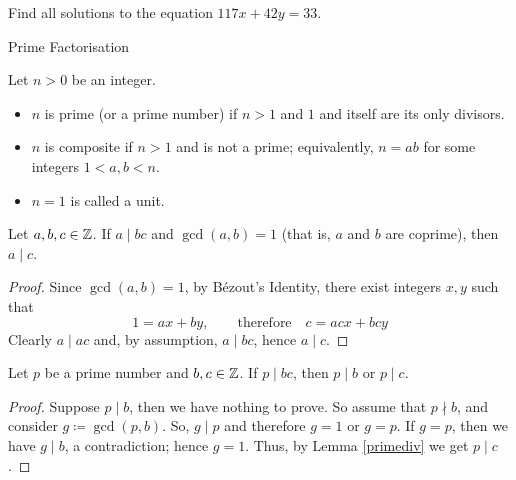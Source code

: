 \newpage

\begin{example}[in-class]
Find all solutions to the equation $117x + 42y = 33$.
\end{example}

\vspace*{2em}

\begin{center}
{\Large Prime Factorisation}
\end{center}

\begin{definition}
Let $n > 0$ be an integer.
\begin{itemize}
\item $n$ is prime (or a prime number) if $n> 1$ and $1$ and itself are its only divisors.
\item $n$ is composite if $n>1$ and is not a prime; equivalently, $n = ab$ for some integers $1<a,b<n$.
\item $n = 1$ is called a unit.
\end{itemize}
\end{definition}

\vspace*{1em}

\begin{lemma}\label{primediv}
Let $a,b,c \in \mathbb Z$. If $a\mid bc$ and $\gcd(a,b) = 1$ (that is, $a$ and $b$ are coprime), then $a\mid c$. 
\end{lemma}
\begin{proof}
Since $\gcd(a,b) = 1$, by B\'ezout's Identity, there exist integers $x,y$ such that 
\[1 = ax + by,\qquad \text{therefore}\quad c = acx + bcy\]
Clearly $a\mid ac$ and, by assumption, $a\mid bc$, hence $a\mid c$.
\end{proof}

\vspace*{1em}

\begin{corollary}
Let $p$ be a prime number and $b,c \in \mathbb Z$. If $p\mid bc$, then $p\mid b$ or $p\mid c$. 
\end{corollary}
\begin{proof}
Suppose $p\mid b$, then we have nothing to prove. So assume that $p\nmid b$, and consider $g \coloneqq \gcd(p,b)$. So, $g\mid p$ and therefore $g = 1$ or $g = p$. If $g = p$, then we have $g\mid b$, a contradiction; hence $g = 1$. Thus, by Lemma \ref{primediv} we get $p\mid c$.
\end{proof}


